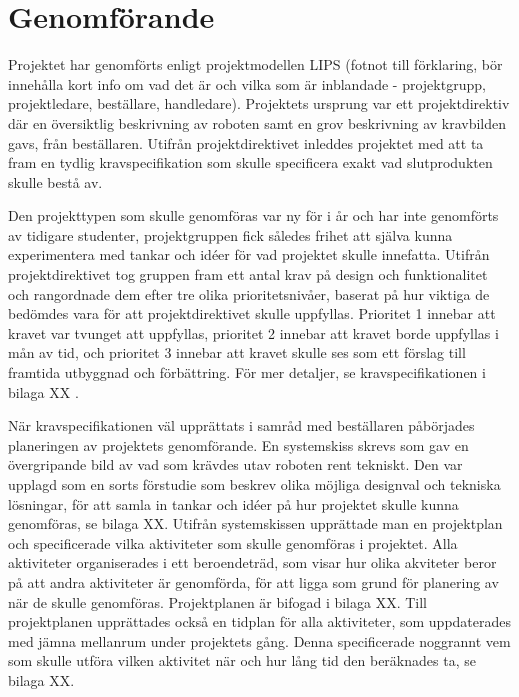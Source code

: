 

\section{Genomförande}

Projektet har genomförts enligt projektmodellen LIPS (fotnot till förklaring, bör innehålla kort info om vad det är och vilka som är inblandade - projektgrupp, projektledare, beställare, handledare). Projektets ursprung var ett projektdirektiv där en översiktlig beskrivning av roboten samt en grov beskrivning av kravbilden gavs, från beställaren. Utifrån projektdirektivet inleddes projektet med att ta fram en tydlig kravspecifikation som skulle specificera exakt vad slutprodukten skulle bestå av.

Den projekttypen som skulle genomföras var ny för i år och har inte genomförts av tidigare studenter, projektgruppen fick således frihet att själva kunna experimentera med tankar och idéer för vad projektet skulle innefatta. Utifrån projektdirektivet tog gruppen fram ett antal krav på design och funktionalitet och rangordnade dem efter tre olika prioritetsnivåer, baserat på hur viktiga de bedömdes vara för att projektdirektivet skulle uppfyllas. Prioritet 1 innebar att kravet var tvunget att uppfyllas, prioritet 2 innebar att kravet borde uppfyllas i mån av tid, och prioritet 3 innebar att kravet skulle ses som ett förslag till framtida utbyggnad och förbättring. För mer detaljer, se kravspecifikationen i bilaga XX .

När kravspecifikationen väl upprättats i samråd med beställaren påbörjades planeringen av projektets genomförande. En systemskiss skrevs som gav en övergripande bild av vad som krävdes utav roboten rent tekniskt. Den var upplagd som en sorts förstudie som beskrev olika möjliga designval och tekniska lösningar, för att samla in tankar och idéer på hur projektet skulle kunna genomföras, se bilaga XX. Utifrån systemskissen upprättade man en projektplan och specificerade vilka aktiviteter som skulle genomföras i projektet. Alla aktiviteter organiserades i ett beroendeträd, som visar hur olika akviteter beror på att andra aktiviteter är genomförda, för att ligga som grund för planering av när de skulle genomföras. Projektplanen är bifogad i bilaga XX. Till projektplanen upprättades också en tidplan för alla aktiviteter, som uppdaterades med jämna mellanrum under projektets gång. Denna specificerade noggrannt vem som skulle utföra vilken aktivitet när och hur lång tid den beräknades ta, se bilaga XX.

